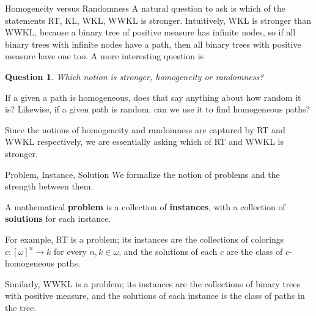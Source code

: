 \begin{frame}{Homogeneity versus Randomness}
  A natural question to ask is which of the statements RT, KL, WKL, WWKL is
  stronger. Intuitively, WKL is stronger than WWKL, because a binary tree
  of positive measure has infinite nodes, so if all binary trees with
  infinite nodes have a path, then all binary trees with positive measure
  have one too. A more interesting question is
  \newtheorem*{question*}{Question}
  \begin{question*}
    Which notion is stronger, homogeneity or randomness?
  \end{question*}
  If a given a path is homogeneous, does that say anything about how random
  it is? Likewise, if a given path is random, can we use it to find
  homogeneous paths?

  \vspace{0.5em}
  Since the notions of homogeneity and randomness are captured by RT and
  WWKL respectively, we are essentially asking which of RT and WWKL is
  stronger.
\end{frame}

\begin{frame}{Problem, Instance, Solution}
  We formalize the notion of problems and the strength between them.

  \vspace{1em}
  \begin{define*}
    A mathematical \textbf{problem} is a collection of \textbf{instances},
    with a collection of \textbf{solutions} for each instance.
  \end{define*}

  \vspace{1em}
  For example, RT is a problem; its instances are the collections of
  colorings $c:[\omega]^n\rightarrow k$ for every $n,k\in\omega$, and the
  solutions of each $c$ are the class of $c$-homogeneous paths.

  \vspace{1em}
  Similarly, WWKL is a problem; its instances are the collections of binary
  trees with positive measure, and the solutions of each instance is the
  class of paths in the tree.
\end{frame}

